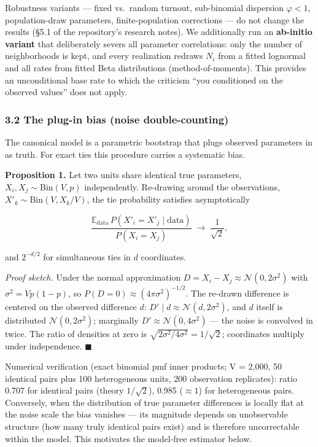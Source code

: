 \documentclass[
  11pt,
]{article}
\begin{document}
Robustness variants --- fixed vs.~random turnout, sub-binomial
dispersion \(\varphi < 1\), population-draw parameters,
finite-population corrections --- do not change the results (§5.1 of the
repository's research notes). We additionally run an \textbf{ab-initio
variant} that deliberately severs all parameter correlations: only the
number of neighborhoods is kept, and every realization redraws \(N_i\)
from a fitted lognormal and all rates from fitted Beta distributions
(method-of-moments). This provides an unconditional base rate to which
the criticism ``you conditioned on the observed values'' does not apply.

\subsubsection{3.2 The plug-in bias (noise
double-counting)}\label{the-plug-in-bias-noise-double-counting}

The canonical model is a parametric bootstrap that plugs observed
parameters in as truth. For exact ties this procedure carries a
systematic bias.

\textbf{Proposition 1.} Let two units share identical true parameters,
\(X_i, X_j \sim
\mathrm{Bin}(V, p)\) independently. Re-drawing around the observations,
\(X'_k \sim
\mathrm{Bin}(V, X_k / V)\), the tie probability satisfies asymptotically

\[\frac{\mathbb{E}_{\mathrm{data}}\, P(X'_i = X'_j \mid \mathrm{data})}{P(X_i = X_j)}
\;\longrightarrow\; \frac{1}{\sqrt{2}},\]

and \(2^{-d/2}\) for simultaneous ties in \(d\) coordinates.

\emph{Proof sketch.} Under the normal approximation
\(D = X_i - X_j \approx \mathcal N(0,
2\sigma^2)\) with \(\sigma^2 = Vp(1-p)\), so
\(P(D = 0) \approx (4\pi\sigma^2)^{-1/2}\). The re-drawn difference is
centered on the observed difference \(d\): \(D' \mid d \approx
\mathcal N(d, 2\sigma^2)\), and \(d\) itself is distributed
\(\mathcal N(0, 2\sigma^2)\); marginally
\(D' \approx \mathcal N(0, 4\sigma^2)\) --- the noise is convolved in
twice. The ratio of densities at zero is
\(\sqrt{2\sigma^2 / 4\sigma^2} = 1/\sqrt 2\); coordinates multiply under
independence. \(\blacksquare\)

Numerical verification (exact binomial pmf inner products; V = 2,000, 50
identical pairs plus 100 heterogeneous units, 200 observation
replicates): ratio 0.707 for identical pairs (theory \(1/\sqrt{2}\)),
0.985 (\(\approx 1\)) for heterogeneous pairs. Conversely, when the
distribution of true parameter differences is locally flat at the noise
scale the bias vanishes --- its magnitude depends on unobservable
structure (how many truly identical pairs exist) and is therefore
uncorrectable within the model. This motivates the model-free estimator
below.
\end{document}
